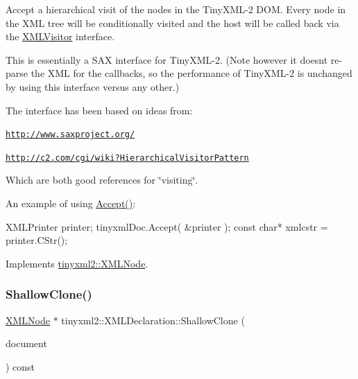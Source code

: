 Accept a hierarchical visit of the nodes in the Tiny\+X\+M\+L-\/2 D\+OM. Every node in the X\+ML tree will be conditionally visited and the host will be called back via the \hyperlink{classtinyxml2_1_1_x_m_l_visitor}{X\+M\+L\+Visitor} interface.

This is essentially a S\+AX interface for Tiny\+X\+M\+L-\/2. (Note however it doesn\textquotesingle{}t re-\/parse the X\+ML for the callbacks, so the performance of Tiny\+X\+M\+L-\/2 is unchanged by using this interface versus any other.)

The interface has been based on ideas from\+:


\begin{DoxyItemize}
\item \href{http://www.saxproject.org/}{\tt http\+://www.\+saxproject.\+org/}
\item \href{http://c2.com/cgi/wiki?HierarchicalVisitorPattern}{\tt http\+://c2.\+com/cgi/wiki?\+Hierarchical\+Visitor\+Pattern}
\end{DoxyItemize}

Which are both good references for \char`\"{}visiting\char`\"{}.

An example of using \hyperlink{classtinyxml2_1_1_x_m_l_declaration_acf47629d9fc08ed6f1c164a97bcf794b}{Accept()}\+: \begin{DoxyVerb}XMLPrinter printer;
tinyxmlDoc.Accept( &printer );
const char* xmlcstr = printer.CStr();
\end{DoxyVerb}
 

Implements \hyperlink{classtinyxml2_1_1_x_m_l_node_a81e66df0a44c67a7af17f3b77a152785}{tinyxml2\+::\+X\+M\+L\+Node}.

\mbox{\label{classtinyxml2_1_1_x_m_l_declaration_ad9d60e6d2df75c13eb6bf7319985b747}} 
\subsubsection{\texorpdfstring{Shallow\+Clone()}{ShallowClone()}}
{\footnotesize\ttfamily \hyperlink{classtinyxml2_1_1_x_m_l_node}{X\+M\+L\+Node} $\ast$ tinyxml2\+::\+X\+M\+L\+Declaration\+::\+Shallow\+Clone (\begin{DoxyParamCaption}\item[{\hyperlink{classtinyxml2_1_1_x_m_l_document}{X\+M\+L\+Document} $\ast$}]{document }\end{DoxyParamCaption}) const\hspace{0.3cm}{\ttfamily [virtual]}}

